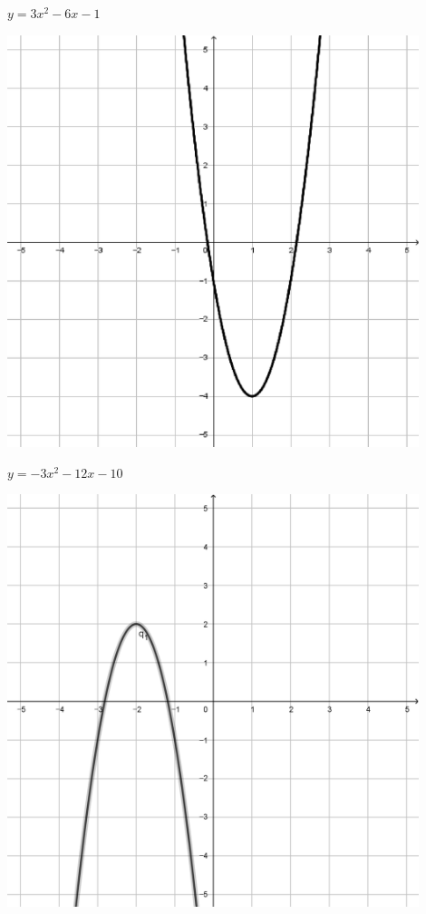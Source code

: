 \documentclass[a4paper]{oblivoir}
\begin{document}
\begin{minipage}{0.45\textwidth}\centering
\(y=3x^2-6x-1\)
\par\bigskip\includegraphics[width=0.9\textwidth]{img/2_quadratic_35}
\end{minipage}
\begin{minipage}{0.45\textwidth}\centering
\(y=-3x^2-12x-10\)
\par\bigskip\includegraphics[width=0.9\textwidth]{img/2_quadratic_36}
\end{minipage}\bigskip\bigskip\par
\end{document}
